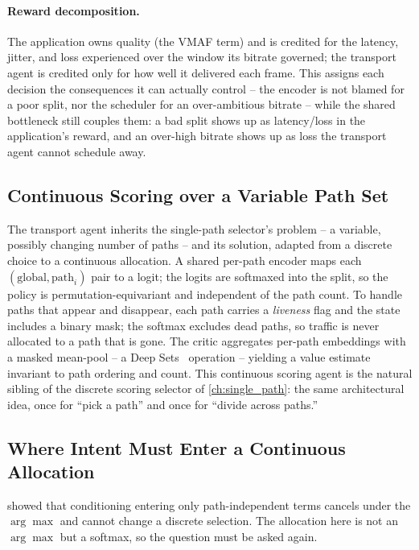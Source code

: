 \paragraph{Reward decomposition.} The application owns quality (the VMAF term) and is credited for the
latency, jitter, and loss experienced over the window its bitrate governed; the transport agent is
credited only for how well it delivered each frame. This assigns each decision the consequences it can
actually control -- the encoder is not blamed for a poor split, nor the scheduler for an over-ambitious
bitrate -- while the shared bottleneck still couples them: a bad split shows up as latency/loss in the
application's reward, and an over-high bitrate shows up as loss the transport agent cannot schedule away.

\subsection{Continuous Scoring over a Variable Path Set}
\label{sec:p2design:scoring}

The transport agent inherits the single-path selector's problem -- a variable, possibly changing number
of paths -- and its solution, adapted from a discrete choice to a continuous allocation. A shared per-path
encoder maps each $(\text{global}, \text{path}_i)$ pair to a logit; the logits are softmaxed into the
split, so the policy is permutation-equivariant and independent of the path count. To handle paths that
appear and disappear, each path carries a \emph{liveness} flag and the state includes a binary mask; the
softmax excludes dead paths, so traffic is never allocated to a path that is gone. The critic aggregates
per-path embeddings with a masked mean-pool -- a Deep Sets~\cite{Zaheer2017} operation -- yielding a value
estimate invariant to path ordering and count. This continuous scoring agent is the natural sibling of the
discrete scoring selector of \cref{ch:single_path}: the same architectural idea, once for ``pick a path''
and once for ``divide across paths.''

\subsection{Where Intent Must Enter a Continuous Allocation}
\label{sec:p2design:cancel}

 showed that conditioning entering only path-independent terms cancels under the
$\arg\max$ and cannot change a discrete selection. The allocation here is not an $\arg\max$ but a
softmax, so the question must be asked again.

